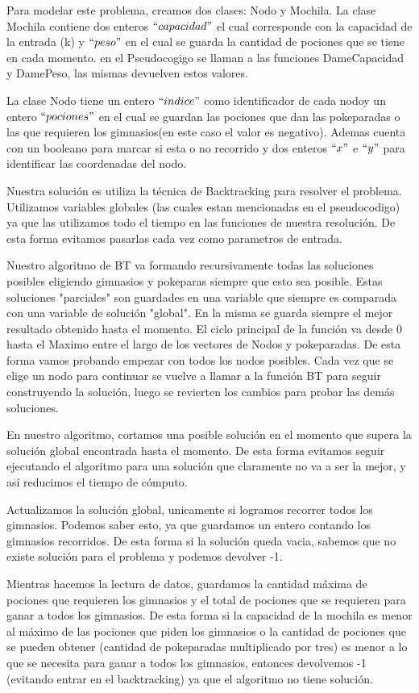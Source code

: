 \documentclass[spanish,12pt]{article}
\begin{document}
Para modelar este problema, creamos dos clases: Nodo y Mochila.
La clase Mochila contiene dos enteros $``capacidad"$ el cual corresponde con la capacidad de la entrada (k) y $``peso"$ en el cual se guarda la cantidad de pociones que se tiene en cada momento. 
en el Pseudocogigo se llaman a las funciones DameCapacidad y DamePeso, las mismas devuelven estos valores.

La clase Nodo tiene  un entero $``indice"$ como identificador de cada nodoy un entero $``pociones"$ en el cual se guardan las pociones que dan las pokeparadas o las que requieren los gimnasios(en este caso el valor es negativo). Ademas cuenta con un booleano para marcar si esta o no recorrido y dos enteros $``x"$ e $``y"$ para identificar las coordenadas del nodo.

Nuestra solución es utiliza la técnica de Backtracking para resolver el problema. Utilizamos variables globales (las cuales estan mencionadas en el pseudocodigo) ya que las utilizamos todo el tiempo en las funciones de nuestra resolución. De esta forma evitamos pasarlas cada vez como parametros de entrada.

Nuestro algoritmo de BT va formando recursivamente todas las soluciones posibles eligiendo gimnasios y pokeparas siempre que esto sea posible. Estas soluciones "parciales" son guardades en una variable que siempre es comparada con una variable de solución "global". En la misma se guarda siempre el mejor resultado obtenido hasta el momento. El ciclo principal de la función va desde 0 hasta el Maximo entre el largo de los vectores de Nodos y pokeparadas. De esta forma vamos probando empezar con todos los nodos posibles. Cada vez que se elige un nodo para continuar se vuelve a llamar a la función BT para seguir construyendo la solución, luego se revierten los cambios para probar las demás soluciones. 

En nuestro algoritmo, cortamos una posible solución en el momento que supera la solución global encontrada hasta el momento. De esta forma evitamos seguir ejecutando el algoritmo para una solución que claramente no va a ser la mejor, y así reducimos el tiempo de cómputo.

Actualizamos la solución global, unicamente si logramos recorrer todos los gimnasios. Podemos saber esto, ya que guardamos un entero contando los gimnasios recorridos. De esta forma si la solución queda vacia, sabemos que no existe solución para el problema y podemos devolver -1.

Mientras hacemos la lectura de datos, guardamos la cantidad máxima de pociones que requieren los gimnasios y el total de pociones que se requieren para ganar a todos los gimnasios. De esta forma si la capacidad de la mochila es menor al máximo de las pociones que piden los gimnasios o la cantidad de pociones que se pueden obtener (cantidad de pokeparadas multiplicado por tres) es menor a lo que se necesita para ganar a todos los gimnasios, entonces devolvemos -1 (evitando entrar en el backtracking) ya que el algoritmo no tiene solución. 
\end{document}
